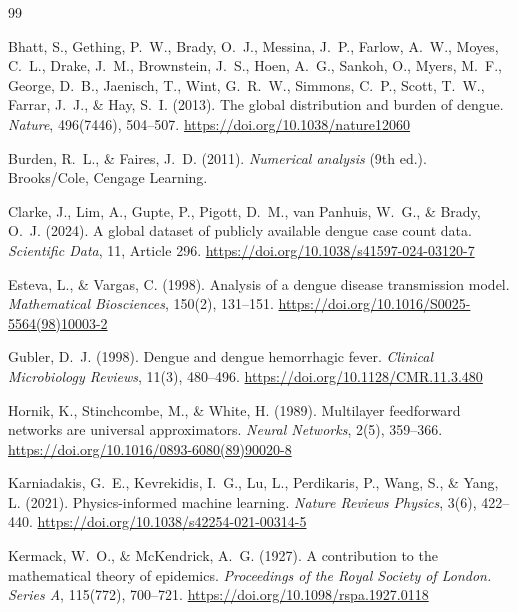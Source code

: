 \documentclass[12pt,a4paper]{article}
\begin{document}
\newpage
\begin{thebibliography}{99}
\setlength{\itemsep}{3pt}
\small

Bhatt, S., Gething, P.~W., Brady, O.~J., Messina, J.~P., Farlow, A.~W., Moyes, C.~L., Drake, J.~M., Brownstein, J.~S., Hoen, A.~G., Sankoh, O., Myers, M.~F., George, D.~B., Jaenisch, T., Wint, G.~R.~W., Simmons, C.~P., Scott, T.~W., Farrar, J.~J., \& Hay, S.~I. (2013).
The global distribution and burden of dengue.
\textit{Nature}, 496(7446), 504--507.
\url{https://doi.org/10.1038/nature12060}

Burden, R.~L., \& Faires, J.~D. (2011).
\textit{Numerical analysis} (9th ed.).
Brooks/Cole, Cengage Learning.

Clarke, J., Lim, A., Gupte, P., Pigott, D.~M., van Panhuis, W.~G., \& Brady, O.~J. (2024).
A global dataset of publicly available dengue case count data.
\textit{Scientific Data}, 11, Article 296.
\url{https://doi.org/10.1038/s41597-024-03120-7}

Esteva, L., \& Vargas, C. (1998).
Analysis of a dengue disease transmission model.
\textit{Mathematical Biosciences}, 150(2), 131--151.
\url{https://doi.org/10.1016/S0025-5564(98)10003-2}

Gubler, D.~J. (1998).
Dengue and dengue hemorrhagic fever.
\textit{Clinical Microbiology Reviews}, 11(3), 480--496.
\url{https://doi.org/10.1128/CMR.11.3.480}

Hornik, K., Stinchcombe, M., \& White, H. (1989).
Multilayer feedforward networks are universal approximators.
\textit{Neural Networks}, 2(5), 359--366.
\url{https://doi.org/10.1016/0893-6080(89)90020-8}

Karniadakis, G.~E., Kevrekidis, I.~G., Lu, L., Perdikaris, P., Wang, S., \& Yang, L. (2021).
Physics-informed machine learning.
\textit{Nature Reviews Physics}, 3(6), 422--440.
\url{https://doi.org/10.1038/s42254-021-00314-5}

Kermack, W.~O., \& McKendrick, A.~G. (1927).
A contribution to the mathematical theory of epidemics.
\textit{Proceedings of the Royal Society of London. Series A}, 115(772), 700--721.
\url{https://doi.org/10.1098/rspa.1927.0118}


\end{thebibliography}
\end{document}
